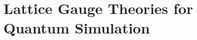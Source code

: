 \chapter{Lattice Gauge Theories for Quantum Simulation}
\label{chap:lattice_gauge_theories_for_quantum_simulation}





